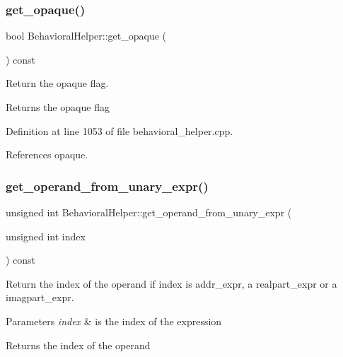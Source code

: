 \subsubsection{\texorpdfstring{get\+\_\+opaque()}{get\_opaque()}}
{\footnotesize\ttfamily bool Behavioral\+Helper\+::get\+\_\+opaque (\begin{DoxyParamCaption}{ }\end{DoxyParamCaption}) const}



Return the opaque flag. 

\begin{DoxyReturn}{Returns}
the opaque flag 
\end{DoxyReturn}


Definition at line 1053 of file behavioral\+\_\+helper.\+cpp.



References opaque.

\mbox{\label{classBehavioralHelper_abc594fddf1e643e040bef82bb2814561}} 
\subsubsection{\texorpdfstring{get\+\_\+operand\+\_\+from\+\_\+unary\+\_\+expr()}{get\_operand\_from\_unary\_expr()}}
{\footnotesize\ttfamily unsigned int Behavioral\+Helper\+::get\+\_\+operand\+\_\+from\+\_\+unary\+\_\+expr (\begin{DoxyParamCaption}\item[{unsigned int}]{index }\end{DoxyParamCaption}) const\hspace{0.3cm}{\ttfamily [virtual]}}



Return the index of the operand if index is addr\+\_\+expr, a realpart\+\_\+expr or a imagpart\+\_\+expr. 


\begin{DoxyParams}{Parameters}
{\em index} & is the index of the expression \\
\hline
\end{DoxyParams}
\begin{DoxyReturn}{Returns}
the index of the operand 
\end{DoxyReturn}


